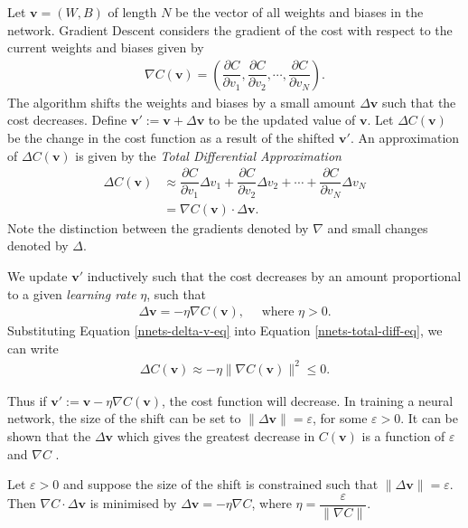 Let $\mathbf{v} = (W,B)$ of length $N$ be the vector of all weights and biases in the network. Gradient Descent considers the gradient of the cost with respect to the current weights and biases given by
\begin{align*}
\nabla C(\mathbf{v}) = \left(\dfrac{\partial C}{\partial v_1}, \dfrac{\partial C}{\partial v_2},\cdots, \dfrac{\partial C}{\partial v_N}\right).
\end{align*}
The algorithm shifts the weights and biases by a small amount $\Delta\mathbf{v}$ such that the cost decreases. Define $\mathbf{v}':= \mathbf{v} + \Delta\mathbf{v}$ to be the updated value of $\mathbf{v}$. Let $\Delta C(\mathbf{v})$ be the change in the cost function as a result of the shifted $\mathbf{v}'$. An approximation of $\Delta C(\mathbf{v})$ is given by the \textit{Total Differential Approximation}
\begin{align}
	\Delta C(\mathbf{v}) & \approx \dfrac{\partial C}{\partial v_1}\Delta v_1 + \dfrac{\partial C}{\partial v_2}\Delta v_2 + \cdots + \dfrac{\partial C}{\partial v_N}\Delta v_N\\
	& = \nabla C(\mathbf{v})\cdot \Delta \mathbf{v}.\label{nnets-total-diff-eq}
\end{align}
Note the distinction between the gradients denoted by $\nabla$ and small changes denoted by $\Delta$.

We update $\mathbf{v}'$ inductively such that the cost decreases by an amount proportional to a given \textit{learning rate} $\eta$, such that
\begin{align}\label{nnets-delta-v-eq}
	\Delta\mathbf{v} = -\eta \nabla C(\mathbf{v}), \quad \text{ where }\eta > 0.
\end{align}
Substituting Equation \eqref{nnets-delta-v-eq} into Equation \eqref{nnets-total-diff-eq}, we can write
\begin{align*}
	\Delta C(\mathbf{v}) \approx -\eta \|\nabla C(\mathbf{v})\|^2 \le 0.
\end{align*}

Thus if $\mathbf{v}' := \mathbf{v} - \eta \nabla C(\mathbf{v})$, the cost function will decrease. In training a neural network, the size of the shift can be set to $\|\Delta\mathbf{v}\| = \varepsilon$, for some $\varepsilon > 0$. It can be shown that the $\Delta\mathbf{v}$ which gives the greatest decrease in $C(\mathbf{v})$ is a function of $\varepsilon$ and $\nabla C$ \citep{Nielson2015}.

\begin{lemma}\label{nnets-graddescminproof}
	Let $\varepsilon > 0$ and suppose the size of the shift is constrained such that $\|\Delta\mathbf{v}\| = \varepsilon$. Then $\nabla C \cdot \Delta\mathbf{v}$ is minimised by $\Delta\mathbf{v} = -\eta\nabla C$, where $\eta = \dfrac{\varepsilon}{\|\nabla C\|}$.
\end{lemma}

